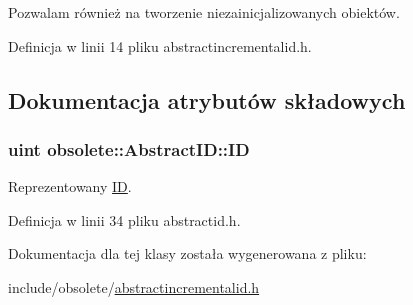 Pozwalam również na tworzenie niezainicjalizowanych obiektów. 



Definicja w linii 14 pliku abstractincrementalid.h.



\subsection{Dokumentacja atrybutów składowych}
\hypertarget{classobsolete_1_1AbstractID_a5f67fa1c7d96085f0ef41193b60b570c}{
\subsubsection[{ID}]{\setlength{\rightskip}{0pt plus 5cm}uint {\bf obsolete::AbstractID::ID}}}
\label{classobsolete_1_1AbstractID_a5f67fa1c7d96085f0ef41193b60b570c}


Reprezentowany \hyperlink{classobsolete_1_1ID}{ID}. 



Definicja w linii 34 pliku abstractid.h.



Dokumentacja dla tej klasy została wygenerowana z pliku:\begin{DoxyCompactItemize}
\item 
include/obsolete/\hyperlink{abstractincrementalid_8h}{abstractincrementalid.h}\end{DoxyCompactItemize}
